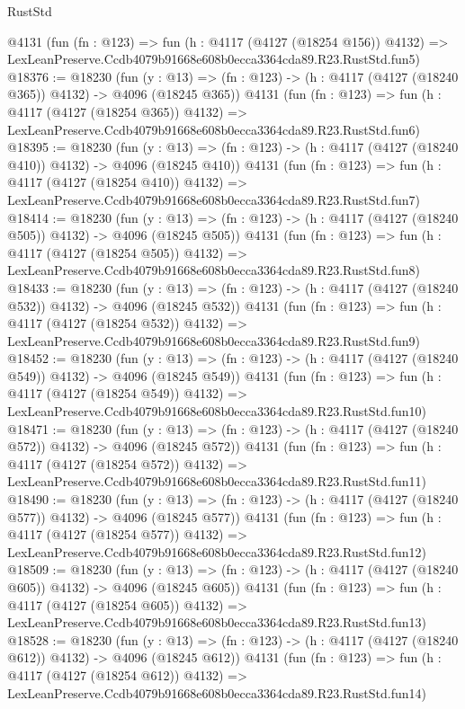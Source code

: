 \begin{lexlean}{RustStd}
\begin{coremodule}
    @4131
    (fun (fn : @123) =>
    fun (h : @4117 (@4127 (@18254 @156)) @4132) =>
    LexLeanPreserve.Ccdb4079b91668e608b0ecca3364cda89.R23.RustStd.fun5)
@18376 := @18230
    (fun (y : @13) => (fn : @123) -> (h : @4117 (@4127 (@18240 @365)) @4132) -> @4096 (@18245 @365))
    @4131
    (fun (fn : @123) =>
    fun (h : @4117 (@4127 (@18254 @365)) @4132) =>
    LexLeanPreserve.Ccdb4079b91668e608b0ecca3364cda89.R23.RustStd.fun6)
@18395 := @18230
    (fun (y : @13) => (fn : @123) -> (h : @4117 (@4127 (@18240 @410)) @4132) -> @4096 (@18245 @410))
    @4131
    (fun (fn : @123) =>
    fun (h : @4117 (@4127 (@18254 @410)) @4132) =>
    LexLeanPreserve.Ccdb4079b91668e608b0ecca3364cda89.R23.RustStd.fun7)
@18414 := @18230
    (fun (y : @13) => (fn : @123) -> (h : @4117 (@4127 (@18240 @505)) @4132) -> @4096 (@18245 @505))
    @4131
    (fun (fn : @123) =>
    fun (h : @4117 (@4127 (@18254 @505)) @4132) =>
    LexLeanPreserve.Ccdb4079b91668e608b0ecca3364cda89.R23.RustStd.fun8)
@18433 := @18230
    (fun (y : @13) => (fn : @123) -> (h : @4117 (@4127 (@18240 @532)) @4132) -> @4096 (@18245 @532))
    @4131
    (fun (fn : @123) =>
    fun (h : @4117 (@4127 (@18254 @532)) @4132) =>
    LexLeanPreserve.Ccdb4079b91668e608b0ecca3364cda89.R23.RustStd.fun9)
@18452 := @18230
    (fun (y : @13) => (fn : @123) -> (h : @4117 (@4127 (@18240 @549)) @4132) -> @4096 (@18245 @549))
    @4131
    (fun (fn : @123) =>
    fun (h : @4117 (@4127 (@18254 @549)) @4132) =>
    LexLeanPreserve.Ccdb4079b91668e608b0ecca3364cda89.R23.RustStd.fun10)
@18471 := @18230
    (fun (y : @13) => (fn : @123) -> (h : @4117 (@4127 (@18240 @572)) @4132) -> @4096 (@18245 @572))
    @4131
    (fun (fn : @123) =>
    fun (h : @4117 (@4127 (@18254 @572)) @4132) =>
    LexLeanPreserve.Ccdb4079b91668e608b0ecca3364cda89.R23.RustStd.fun11)
@18490 := @18230
    (fun (y : @13) => (fn : @123) -> (h : @4117 (@4127 (@18240 @577)) @4132) -> @4096 (@18245 @577))
    @4131
    (fun (fn : @123) =>
    fun (h : @4117 (@4127 (@18254 @577)) @4132) =>
    LexLeanPreserve.Ccdb4079b91668e608b0ecca3364cda89.R23.RustStd.fun12)
@18509 := @18230
    (fun (y : @13) => (fn : @123) -> (h : @4117 (@4127 (@18240 @605)) @4132) -> @4096 (@18245 @605))
    @4131
    (fun (fn : @123) =>
    fun (h : @4117 (@4127 (@18254 @605)) @4132) =>
    LexLeanPreserve.Ccdb4079b91668e608b0ecca3364cda89.R23.RustStd.fun13)
@18528 := @18230
    (fun (y : @13) => (fn : @123) -> (h : @4117 (@4127 (@18240 @612)) @4132) -> @4096 (@18245 @612))
    @4131
    (fun (fn : @123) =>
    fun (h : @4117 (@4127 (@18254 @612)) @4132) =>
    LexLeanPreserve.Ccdb4079b91668e608b0ecca3364cda89.R23.RustStd.fun14)

\end{coremodule}
\end{lexlean}
